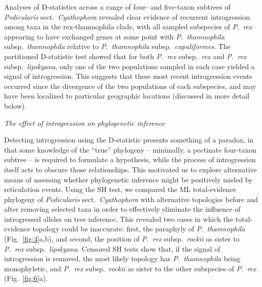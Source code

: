 \documentclass[12pt,letterpaper]{article}
\renewcommand{\subsection}[1]{%
\bigskip
\begin{center}
\begin{large}
\normalfont\itshape #1
\end{large}
\end{center}}
\begin{document}
Analyses of D-statistics across a range of four- and five-taxon subtrees of
\emph{Pedicularis} sect.\ \emph{Cyathophora} revealed clear evidence
of recurrent introgression among taxa in the rex-thamnophila clade,
with all sampled subspecies of \emph{P.~rex} appearing to have exchanged
genes at some point with \emph{P.~thamnophila} subsp.\
\emph{thamnophila} relative to \emph{P.~thamnophila} subsp.\
\emph{cupuliformes}. The partitioned D-statistic test showed that for
both \emph{P.~rex} subsp.\ \emph{rex} and \emph{P.~rex} subsp.\
\emph{lipskyana}, only one of the two populations sampled in each case
yielded a signal of introgression. This suggests that these most
recent introgression events occurred since the divergence of the two
populations of each subspecies, and may have been localized to
particular geographic locations (discussed in more detail below).

\subsection{The effect of introgression on phylogenetic inference}

Detecting introgression using the D-statistic presents something of a
paradox, in that some knowledge of the ``true'' phylogeny --
minimally, a pectinate four-taxon subtree -- is required to formulate
a hypothesis, while the process of introgression itself acts to
obscure those relationships. This motivated us to explore alternative
means of assessing whether phylogenetic inference might be positively
misled by reticulation events. Using the SH test, we compared the ML
total-evidence phylogeny of \emph{Pedicularis} sect.\
\emph{Cyathophora} with alternative topologies before and after
removing selected taxa in order to effectively eliminate the influence
of introgressed alleles on tree inference. This revealed two cases in
which the total-evidence topology could be inaccurate: first, the
paraphyly of \emph{P.~thamnophila} (Fig.~\ref{fig:4}a,b), and second,
the position of \emph{P.~rex} subsp.\ \emph{rockii} as sister to
\emph{P.~rex} subsp.\ \emph{lipskyana}. Censored SH tests show that,
if the signal of introgression is removed, the most likely topology
has \emph{P.~thamnophila} being monophyletic, and \emph{P.~rex}
subsp.\ \emph{rockii} as sister to the other subspecies of
\emph{P.~rex} (Fig.~\ref{fig:6}a).
\end{document}
